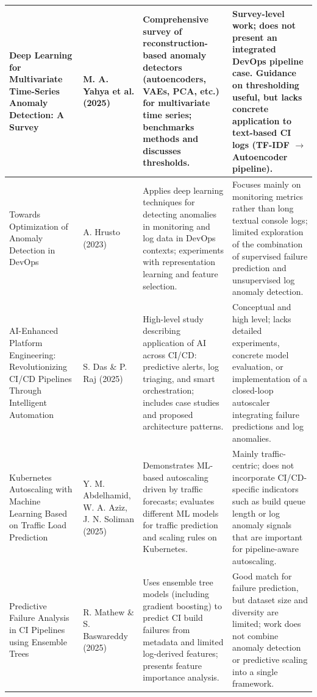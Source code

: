 \documentclass[a4paper,14pt,onecolumn]{report}
\begin{document}
\begin{longtable}{|p{3.9cm}|p{2.9cm}|p{4.0cm}|p{3.4cm}|}
Deep Learning for Multivariate Time-Series Anomaly Detection: A Survey~\cite{yahya2025} &
M. A. Yahya et al. (2025) &
Comprehensive survey of reconstruction-based anomaly detectors (autoencoders, VAEs, PCA, etc.) for multivariate time series; benchmarks methods and discusses thresholds. &
Survey-level work; does not present an integrated DevOps pipeline case. Guidance on thresholding useful, but lacks concrete application to text-based CI logs (TF-IDF $\rightarrow$ Autoencoder pipeline). \\
\hline

Towards Optimization of Anomaly Detection in DevOps~\cite{hrusto2023} &
A. Hrusto (2023) &
Applies deep learning techniques for detecting anomalies in monitoring and log data in DevOps contexts; experiments with representation learning and feature selection. &
Focuses mainly on monitoring metrics rather than long textual console logs; limited exploration of the combination of supervised failure prediction and unsupervised log anomaly detection. \\
\hline

AI-Enhanced Platform Engineering: Revolutionizing CI/CD Pipelines Through Intelligent Automation~\cite{das2025} &
S. Das \& P. Raj (2025) &
High-level study describing application of AI across CI/CD: predictive alerts, log triaging, and smart orchestration; includes case studies and proposed architecture patterns. &
Conceptual and high level; lacks detailed experiments, concrete model evaluation, or implementation of a closed-loop autoscaler integrating failure predictions and log anomalies.\\
\hline

Kubernetes Autoscaling with Machine Learning Based on Traffic Load Prediction~\cite{abdelhamid2025} &
Y. M. Abdelhamid, W. A. Aziz, J. N. Soliman (2025) &
Demonstrates ML-based autoscaling driven by traffic forecasts; evaluates different ML models for traffic prediction and scaling rules on Kubernetes. &
Mainly traffic-centric; does not incorporate CI/CD-specific indicators such as build queue length or log anomaly signals that are important for pipeline-aware autoscaling. \\
\hline

Predictive Failure Analysis in CI Pipelines using Ensemble Trees~\cite{mathew2025} &
R. Mathew \& S. Baswareddy (2025) &
Uses ensemble tree models (including gradient boosting) to predict CI build failures from metadata and limited log-derived features; presents feature importance analysis. &
Good match for failure prediction, but dataset size and diversity are limited; work does not combine anomaly detection or predictive scaling into a single framework. \\
\hline


\end{longtable}
\end{document}
